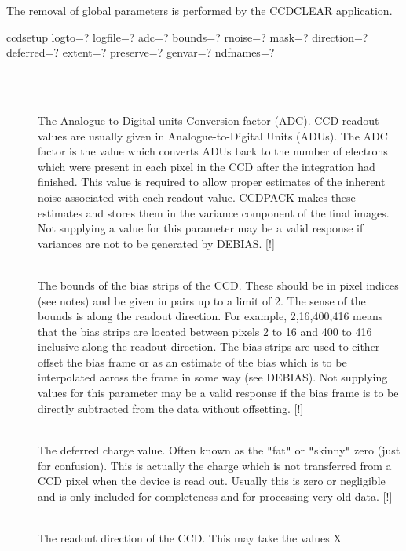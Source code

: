 \documentclass[twoside,11pt]{article}
\newcommand{\htmlref}[2]{#1}
\newcommand{\xlabel}[1]{}
\renewcommand{\_}{\texttt{\symbol{95}}}
\newcommand{\qt}[1]{{\tt "}#1{\tt "}}
\newcommand{\xroutine}[1]{\htmlref{{\sc #1}}{#1}}
\newcommand{\sstusage}[1]{\item[Usage:] \mbox{}
   \begin{description}
      {\ssttt \item #1}
   \end{description}
}
\newcommand{\sstparameters}[1]{
   \item[Parameters:] \mbox{} \\
   \vspace{-3.5ex}
   \begin{description}
      #1
   \end{description}
}
\newcommand{\sstsubsection}[1]{ \item[{#1}] \mbox{} \\}
\newcommand{\sstusage}[1]{\item[Usage:]
      \begin{description}
         {\ssttt #1}
      \end{description}
      \\
   }
\newcommand{\sstparameters}[1]{
      \item[Parameters:] \\
      \begin{description}
         #1
      \end{description}
      \\
   }
\newcommand{\sstsubsection}[1]{\item[{#1}]}
\begin{document}
{{      The removal of global parameters is performed by the \xroutine{CCDCLEAR}
      application.
   }
   \sstusage{
      ccdsetup logto=? logfile=? adc=? bounds=? rnoise=? mask=?
               direction=? deferred=? extent=? preserve=? genvar=?
               ndfnames=?
   }
   \sstparameters{
      \sstsubsection{
         \xlabel{CCDADC}
         ADC = \_DOUBLE (Read and Write)
      } {
         The Analogue-to-Digital units Conversion factor (ADC). CCD
         readout values are usually given in Analogue-to-Digital Units
         (ADUs). The ADC factor is the value which converts ADUs back
         to the number of electrons which were present in each pixel in
         the CCD after the integration had finished. This value is
         required to allow proper estimates of the inherent noise
         associated with each readout value. CCDPACK makes these
         estimates and stores them in the variance component of the
         final images. Not supplying a value for this parameter may be a
         valid response if variances are not to be generated by \xroutine{DEBIAS}.
         [!]
      }
      \sstsubsection{
         \xlabel{CCDbounds}
         BOUNDS( 2 or 4 ) = \_INTEGER (Read and Write)
      } {
         The bounds of the bias strips of the CCD. These should be in
         pixel indices (see notes) and be given in pairs up to a limit
         of 2. The sense of the bounds is along the readout direction.
         For example, 2,16,400,416 means that the bias strips are
         located between pixels 2 to 16 and 400 to 416 inclusive along
         the readout direction. The bias strips are used to either
         offset the bias frame or as an estimate of the bias which is to
         be interpolated across the frame in some way (see \xroutine{DEBIAS}). Not
         supplying values for this parameter may be a valid response if
         the bias frame is to be directly subtracted from the data
         without offsetting.
         [!]
      }
      \sstsubsection{
         \xlabel{CCDdeferred}
         DEFERRED = \_DOUBLE (Read and Write)
      } {
         The deferred charge value. Often known as the \qt{fat} or \qt{skinny}
         zero (just for confusion). This is actually the charge which is
         not transferred from a CCD pixel when the device is read out.
         Usually this is zero or negligible and is only included for
         completeness and for processing very old data.
         [!]
      }
      \sstsubsection{
         \xlabel{CCDdirection}
         DIRECTION = LITERAL (Read and Write)
      } {
         The readout direction of the CCD. This may take the values X
}}}
\end{document}
